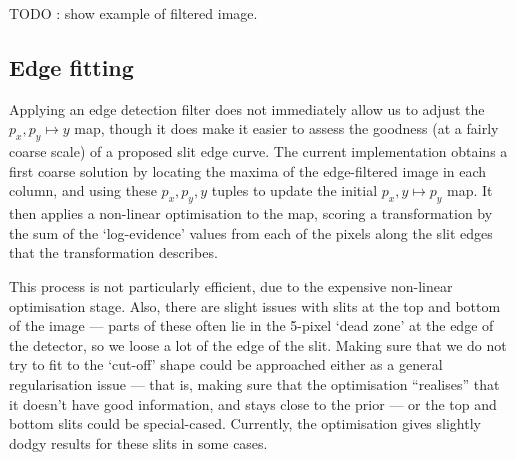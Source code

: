 TODO : show example of filtered image.

\subsection{Edge fitting}

Applying an edge detection filter does not immediately allow us to
adjust the $p_x, p_y \mapsto y$ map, though it does make it easier to
assess the goodness (at a fairly coarse scale) of a proposed slit edge
curve. The current implementation obtains a first coarse solution by
locating the maxima of the edge-filtered image in each column, and using
these $p_x, p_y, y$ tuples to update the initial $p_x, y \mapsto p_y$
map. It then applies a non-linear optimisation to the map, scoring a
transformation by the sum of the `log-evidence' values from each of the
pixels along the slit edges that the transformation describes.

This process is not particularly efficient, due to the expensive
non-linear optimisation stage. Also, there are slight issues with slits
at the top and bottom of the image --- parts of these often lie in the
5-pixel `dead zone' at the edge of the detector, so we loose a lot of
the edge of the slit. Making sure that we do not try to fit to the
`cut-off' shape could be approached either as a general regularisation
issue --- that is, making sure that the optimisation ``realises'' that
it doesn't have good information, and stays close to the prior ---
or the top and bottom slits could be special-cased. Currently, the
optimisation gives slightly dodgy results for these slits in some cases.

